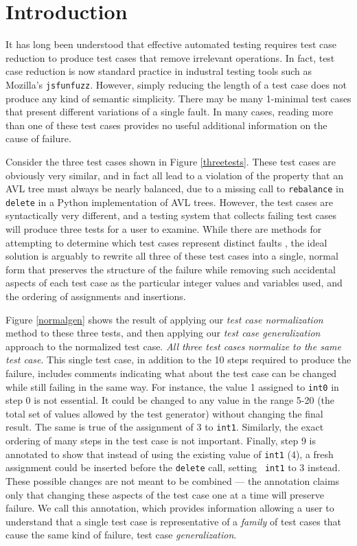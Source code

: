 \section{Introduction}

It has long been understood that effective automated testing requires
test case reduction \cite{DD,MinUnit,ICSEDiff} to produce test cases
that remove irrelevant operations.  In fact, test case reduction is
now standard practice in industral testing tools such as Mozilla's
{\tt jsfunfuzz}.  However, simply reducing the length of a test case
does not produce any kind of semantic simplicity.  There may be many
1-minimal test cases that present different variations of a single
fault.  In many cases, reading more than one of these test cases
provides no useful additional information on the cause of failure.

Consider the three test cases shown in Figure \ref{threetests}.  These
test cases are obviously very similar, and in fact all lead to a
violation of the property that an AVL tree must always be nearly
balanced, due to a missing call to {\tt rebalance} in {\tt delete} in
a Python implementation of AVL trees.  However, the test cases are
syntactically very different, and a testing system that collects
failing test cases will produce three tests for a user to examine.
While there are methods for attempting to determine which test cases
represent distinct faults \cite{PLDI13}, the ideal solution is
arguably to rewrite all three of these test cases into a single,
normal form that preserves the structure of the failure while removing
such accidental aspects of each test case as the particular integer
values and variables used, and the ordering of assignments and
insertions.

Figure \ref{normalgen} shows the result of applying our \emph{test case
  normalization} method to these three tests, and then applying our
\emph{test case generalization} approach to the normalized test case.
\emph{All three test cases normalize to the same test
case}.  This single test case, in addition to the 10 steps required to produce
the failure, includes comments indicating what about the test case can
be changed while still failing in the same way.  For instance, the
value 1 assigned to {\tt int0} in step 0 is not essential.  It could
be changed to any value in the range 5-20 (the total set of values
allowed by the test generator) without changing the final result.  The
same is true of the assignment of 3 to {\tt int1}.  Similarly, the
exact ordering of many steps in the test case is not important.  Finally,
step 9 is annotated to show that instead of using the existing value
of {\tt int1} (4), a fresh assignment could be inserted before the
{\tt delete} call, setting {\tt
  int1} to 3 instead.  These possible
changes are not meant to be combined --- the annotation claims only
that changing these aspects of the test case one at a time will
preserve failure.  We call this annotation, which provides information
allowing a user to understand that a single test case is
representative of a \emph{family} of test cases that cause the same
kind of failure, test case \emph{generalization}.

